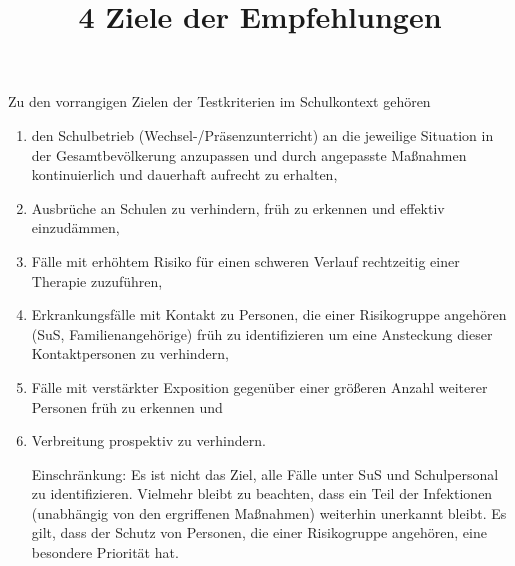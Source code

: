 \documentclass{article}
\begin{document}
\title{4 Ziele der Empfehlungen}

\maketitle


Zu den vorrangigen Zielen der Testkriterien im Schulkontext gehören

\begin{enumerate}
\item den Schulbetrieb (Wechsel-/Präsenzunterricht) an die jeweilige Situation in der Gesamtbevölkerung anzupassen und durch angepasste Maßnahmen kontinuierlich und dauerhaft aufrecht zu erhalten, 


\item Ausbrüche an Schulen zu verhindern, früh zu erkennen und effektiv einzudämmen, 


\item Fälle mit erhöhtem Risiko für einen schweren Verlauf rechtzeitig einer Therapie zuzuführen, 


\item Erkrankungsfälle mit Kontakt zu Personen, die einer Risikogruppe angehören (SuS, Familienangehörige) früh zu identifizieren um eine Ansteckung dieser Kontaktpersonen zu verhindern, 


\item Fälle mit verstärkter Exposition gegenüber einer größeren Anzahl weiterer Personen früh zu erkennen und 


\item Verbreitung prospektiv zu verhindern. 


Einschränkung: Es ist nicht das Ziel, alle Fälle unter SuS und Schulpersonal zu identifizieren. Vielmehr bleibt zu beachten, dass ein Teil der Infektionen (unabhängig von den ergriffenen Maßnahmen) weiterhin unerkannt bleibt. Es gilt, dass der Schutz von Personen, die einer Risikogruppe angehören, eine besondere Priorität hat.





\end{enumerate}
\end{document}
